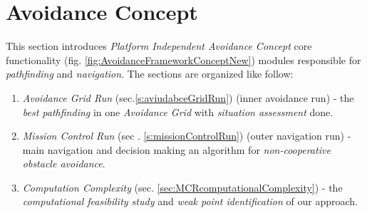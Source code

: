 \cleardoublepage
\section{Avoidance Concept}\label{s:avoidanceConcept}
\noindent This section introduces \emph{Platform Independent Avoidance Concept} core functionality (fig. \ref{fig:AvoidanceFrameworkConceptNew}) modules responsible for \emph{pathfinding} and \emph{navigation}. The sections are organized like follow:

\begin{enumerate}
    
    \item \emph{Avoidance Grid Run} (sec.\ref{s:aviudabceGridRun}) (inner avoidance run) - the \emph{best pathfinding} in one \emph{Avoidance Grid} with \emph{situation assessment} done.
    
    \item \emph{Mission Control Run} (sec . \ref{s:missionControlRun}) (outer navigation run) - main navigation and decision making an algorithm for \emph{non-cooperative obstacle avoidance}.
    
    \item \emph{Computation Complexity} (sec. \ref{sec:MCRcomputationalComplexity}) - the \emph{computational feasibility study} and \emph{weak point identification} of our approach.
    
\end{enumerate}
